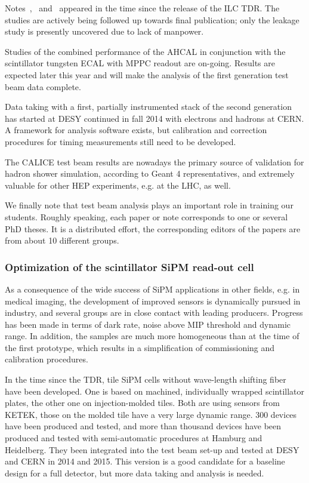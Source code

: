 Notes~\cite{Calice:CAN048},~\cite{Calice:CAN049} and~\cite{Calice:CAN051} appeared in the time since the release of the ILC TDR. The studies are actively being followed up towards final publication; only the leakage study is presently uncovered due to lack of manpower.

Studies of the combined performance of the AHCAL in conjunction with the scintillator tungsten ECAL with MPPC readout are on-going. Results are expected later this year and will make the analysis of the first generation test beam data complete.

Data taking with a first, partially instrumented stack of the second generation has started at DESY continued in fall 2014 with electrons and hadrons at CERN. A framework for analysis software exists, but calibration and correction procedures for timing measurements still need to be developed.

The CALICE test beam results are nowadays the primary source of validation for hadron shower simulation, according to Geant 4 representatives, and extremely valuable for other HEP experiments, e.g. at the LHC, as well.

We finally note that test beam analysis plays an important role in training our students. Roughly speaking, each paper or note corresponds to one or several PhD theses. It is a distributed effort, the corresponding editors of the papers are from about 10 different groups.

\subsubsection{Optimization of the scintillator SiPM read-out cell}
\label{sec:OptimizationSiPMRO}

As a consequence of the wide success of SiPM applications in other fields, e.g. in medical imaging, the development of improved sensors is dynamically pursued in industry, and several groups are in close contact with leading producers. Progress has been made in terms of dark rate, noise above MIP threshold and dynamic range. In addition, the samples are much more homogeneous than at the time of the first prototype, which results in a simplification of commissioning and calibration procedures.

In the time since the TDR, tile SiPM cells without wave-length shifting fiber have been developed. One is based on machined, individually wrapped scintillator plates, the other one on injection-molded tiles. Both are using sensors from KETEK, those on the molded tile have a very large dynamic range. 300 devices have been produced and tested, and more than thousand devices have been produced and tested with semi-automatic procedures at Hamburg and Heidelberg. They been integrated into the test beam set-up and tested at DESY and CERN in 2014 and 2015. This version is a good candidate for a baseline design for a full detector, but more data taking and analysis is needed.

